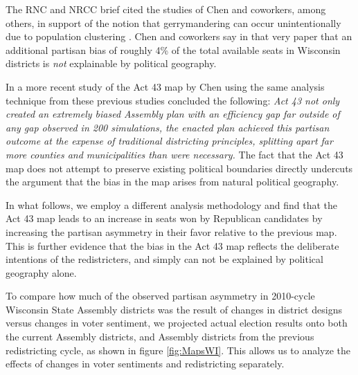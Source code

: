 \documentclass[preprint,12pt]{article}
\begin{document}
The RNC and NRCC brief cited the studies of Chen and coworkers, among others, in support of the notion that gerrymandering can occur unintentionally due to population clustering \cite{Chen_2015_10.1089/elj.2015.0317,Chen_2016_10.1016/j.electstud.2016.06.014}.
Chen and coworkers say in that very paper that an additional partisan bias of roughly 4\% of the total available seats in Wisconsin districts is \emph{not} explainable by political geography.

In a more recent study of the Act 43 map by Chen \cite{Chen_2017_} using the same analysis technique from these previous studies concluded the following: \emph{Act 43 not only created an extremely biased Assembly plan with an efficiency gap far outside of any gap observed in 200 simulations, the enacted plan achieved this partisan outcome at the expense of traditional districting principles, splitting apart far more counties and municipalities than were necessary.}
The fact that the Act 43 map does not attempt to preserve existing political boundaries directly undercuts the argument that the bias in the map arises from natural political geography.

In what follows, we employ a different analysis methodology and find that the Act 43 map leads to an increase in seats won by Republican candidates by increasing the partisan asymmetry in their favor relative to the previous map.
This is further evidence that the bias in the Act 43 map reflects the deliberate intentions of the redistricters, and simply can not be explained by political geography alone.

To compare how much of the observed partisan asymmetry in 2010-cycle Wisconsin State Assembly districts was the result of changes in district designs versus changes in voter sentiment, we projected actual election results onto both the current Assembly districts, and Assembly districts from the previous redistricting cycle, as shown in figure \ref{fig:MapsWI}.
This allows us to analyze the effects of changes in voter sentiments and redistricting separately.
\end{document}
